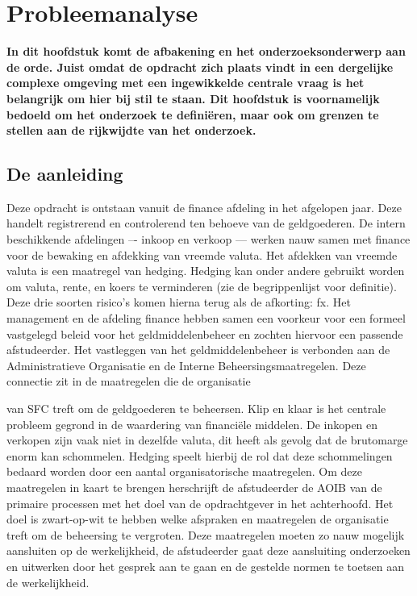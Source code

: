 \chapter{Probleemanalyse}
\label{hoofdstuk:probleemanalyse}
\textbf{In dit hoofdstuk komt de afbakening en het onderzoeksonderwerp aan de orde. Juist omdat de opdracht zich plaats vindt in een dergelijke complexe omgeving met een ingewikkelde centrale vraag is het belangrijk om hier bij stil te staan. Dit hoofdstuk is voornamelijk bedoeld om het onderzoek te definiëren, maar ook om grenzen te stellen aan de rijkwijdte van het onderzoek.}

\medskip 

\section{De aanleiding}
Deze opdracht is ontstaan vanuit de finance afdeling in het afgelopen jaar. Deze handelt registrerend en controlerend ten behoeve van de \gls{geldgoederen}. De intern beschikkende afdelingen –- inkoop en verkoop --– werken nauw samen met finance voor de bewaking en afdekking van vreemde valuta. Het afdekken van vreemde valuta is een maatregel van hedging. Hedging kan onder andere gebruikt worden om \gls{valuta}, \gls{rente}, en \gls{koers} te verminderen (zie de begrippenlijst voor definitie). Deze drie soorten risico's komen hierna terug als de afkorting: \gls{fx}. Het management en de afdeling finance hebben samen een voorkeur voor een formeel vastgelegd beleid voor het geldmiddelenbeheer en zochten hiervoor een passende afstudeerder. Het vastleggen van het geldmiddelenbeheer is verbonden aan de Administratieve Organisatie en de Interne Beheersingsmaatregelen. Deze connectie zit in de maatregelen die de organisatie

\vfill
\begin{center}
\end{center}

\noindent
van SFC treft om de \gls{geldgoederen} te beheersen. Klip en klaar is het centrale probleem gegrond in de waardering van financiële middelen. De inkopen en verkopen zijn vaak niet in dezelfde valuta, dit heeft als gevolg dat de brutomarge enorm kan schommelen. Hedging speelt hierbij de rol dat deze schommelingen bedaard worden door een aantal organisatorische maatregelen. Om deze maatregelen in kaart te brengen herschrijft de afstudeerder de AOIB van de primaire processen met het doel van de opdrachtgever in het achterhoofd. Het doel is zwart-op-wit te hebben welke afspraken en maatregelen de organisatie treft om de beheersing te vergroten. Deze maatregelen moeten zo nauw mogelijk aansluiten op de werkelijkheid, de afstudeerder gaat deze aansluiting onderzoeken en uitwerken door het gesprek aan te gaan en de gestelde normen te toetsen aan de werkelijkheid. 

